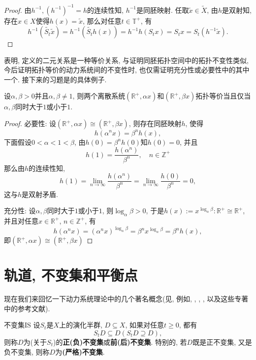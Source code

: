 \begin{proof}
	由$h^{-1},(h^{-1})^{-1}=h$的连续性知, $h^{-1}$是同胚映射. 任取$\tilde{x}\in \tilde{X}$, 由$h$是双射知, 存在$x\in X$使得$h(x)=\tilde{x}$, 那么对任意$t\in\mathbb{T}^{+}$, 有$$
	h^{-1}(\tilde{S_{t}}\tilde{x})=h^{-1}(\tilde{S_{t}}h(x))=h^{-1}h(S_{t}x)=S_{t}x=S_{t}(h^{-1}\tilde{x}).$$
\end{proof}

表明, 定义的二元关系是一种等价关系, 与证明同胚拓扑空间中的拓扑不变性类似, 今后证明拓扑等价的动力系统间的不变性时, 也仅需证明充分性或必要性中的其中一个. 接下来的习题是的具体例子. 

\begin{exercise}
设$\alpha,\beta>0$并且$\alpha,\beta\neq 1$, 则两个离散系统$(\mathbb{R}^{+},\alpha x)$和$(\mathbb{R}^{+},\beta x)$拓扑等价当且仅当$\alpha,\beta$同时大于$1$或小于$1$.
\end{exercise}

\begin{proof}
	必要性: 设$(\mathbb{R}^{+},\alpha x)\cong (\mathbb{R}^{+},\beta x)$, 则存在同胚映射$h$, 使得$$
	h(\alpha^{n} x)=\beta^{n} h(x),$$下面假设$0<\alpha <1<\beta$, 由$h(0)=\beta^{n} h(0)$知$h(0)=0$, 并且$$h(1)=\frac{h(\alpha^{n})}{\beta^{n}},\quad n\in\mathbb{Z}^{+}$$那么由$h$的连续性知, $$h(1)=\lim_{n\to\infty}\frac{h(\alpha^{n})}{\beta^{n}}=\lim_{n\to\infty}\frac{h(0)}{\beta^{n}}=0,$$这与$h$是双射矛盾.
	
	充分性: 设$\alpha,\beta$同时大于$1$或小于$1$, 则$\log_{\alpha}\beta>0$, 于是$h(x):=x^{\log_{\alpha}\beta}:\mathbb{R}^{+}\cong \mathbb{R}^{+}$, 并且对任意$x\in\mathbb{R}^{+}$, $n\in \mathbb{Z}^{+}$, 有$$h(\alpha^{n} x)=(\alpha^{n} x)^{\log_{\alpha}\beta}=\beta^{n} x^{\log_{\alpha}\beta}=\beta^{n} h(x),$$即$(\mathbb{R}^{+},\alpha x)\cong (\mathbb{R}^{+},\beta x)$
\end{proof}


\section{轨道, 不变集和平衡点}
现在我们来回忆一下动力系统理论中的几个著名概念(见, 例如\cite{Babin92}, \cite{Chueshov99}, \cite{Nemytskii60}, \cite{Sibirsky75}, \cite{Temam97}以及这些专著中的参考文献).

\begin{definition}{不变集}{IS}
	设$S_{t}$是$X$上的演化半群, $D\subseteq X$, 如果对任意$t\geqslant 0$, 都有$$
	S_{t}D\subseteq D(S_{t}D \supseteq D),$$则称$D$为(关于$S_{t}$)的\textbf{正(负)不变集}或\textbf{前(后)不变集}. 特别的, 若$D$既是正不变集, 又是负不变集, 则称$D$为\textbf{(严格)不变集}.
\end{definition}

